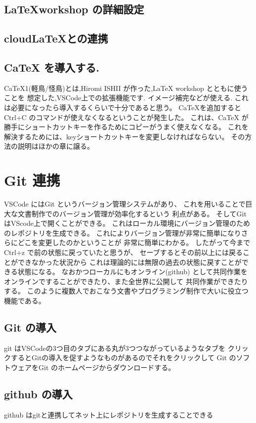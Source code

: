 \documentclass{ltjsarticle}
\begin{document}
\subsection{\LaTeX workshop の詳細設定}

\subsection{cloud\LaTeX との連携}
\subsection{CaTeX を導入する.}
CaTeX1(軽鳥/怪鳥)とは,Hiromi ISHII が作った,LaTeX workshop とともに使うことを
想定した,VSCode上での拡張機能です.
イメージ補完などが使える.
これは必要になったら導入するくらいで十分であると思う。
CaTeXを追加するとCtrl+C のコマンドが使えなくなるということが発生した。
これは、CaTeX が勝手にショートカットキーを作るためにコピーがうまく使えなくなる。
これを解決するためには、keyショートカットキーを変更しなければならない。
その方法の説明はほかの章に譲る。


\section{Git 連携}
VSCode にはGit というバージョン管理システムがあり、
これを用いることで巨大な文書制作でのバージョン管理が効率化するという
利点がある。
そしてGit はVScode上で開くことができる。
これはローカル環境にバージョン管理のためのレポジトリを生成できる。
これによりバージョン管理が非常に簡単になりさらにどこを変更したのかということが
非常に簡単にわかる。
したがって今までCtrl+z で前の状態に戻っていたと思うが、
セーブするとその前以上には戻ることができなかった状況から
これは理論的には無限の過去の状態に戻すことができる状態になる。
なおかつローカルにもオンライン(github)
として共同作業をオンラインですることができたり、また全世界に公開して
共同作業ができたりする。
このように複数人でおこなう文書やプログラミング制作で大いに役立つ機能である。
\subsection{Git の導入}
git はVSCodeの3つ目のタブにある丸が3つつながっているようなタブを
クリックするとGitの導入を促すようなものがあるのでそれをクリックして
Git のソフトウェアをGit のホームページからダウンロードする。
\subsection{github の導入}
github はgitと連携してネット上にレポジトリを生成することできる
\end{document}
